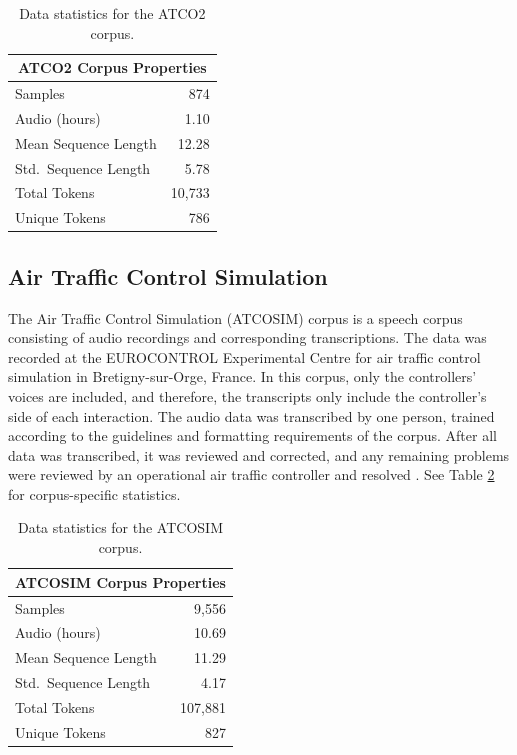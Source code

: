 \documentclass[12pt]{article}
\begin{document}
\begin{table}
    \centering
    \begin{tabular}{l r}
        \toprule
        \multicolumn{2}{c}{ATCO2 Corpus Properties} \\
        \midrule
        Samples              & 874                  \\
        Audio (hours)        & 1.10                 \\
        Mean Sequence Length & 12.28                \\
        Std.~Sequence Length & 5.78                 \\
        Total Tokens         & 10,733               \\
        Unique Tokens        & 786                  \\
        \bottomrule
    \end{tabular}
    \caption{Data statistics for the ATCO2 corpus.}
    \label{tab:atco2_stats}
\end{table}

\subsection{Air Traffic Control Simulation}\label{sec:atcosim}
The Air Traffic Control Simulation (ATCOSIM) corpus is a speech corpus consisting of audio recordings and corresponding transcriptions. The data was recorded at the EUROCONTROL Experimental Centre for air traffic control simulation in Bretigny-sur-Orge, France. In this corpus, only the controllers' voices are included, and therefore, the transcripts only include the controller's side of each interaction. The audio data was transcribed by one person, trained according to the guidelines and formatting requirements of the corpus. After all data was transcribed, it was reviewed and corrected, and any remaining problems were reviewed by an operational air traffic controller and resolved \cite{hofbauer_atcosim_2008}. See Table \ref{tab:atcosim_stats} for corpus-specific statistics.

\begin{table}
    \centering
    \begin{tabular}{l r}
        \toprule
        \multicolumn{2}{c}{ATCOSIM Corpus Properties} \\
        \midrule
        Samples              & 9,556                  \\
        Audio (hours)        & 10.69                  \\
        Mean Sequence Length & 11.29                  \\
        Std.~Sequence Length & 4.17                   \\
        Total Tokens         & 107,881                \\
        Unique Tokens        & 827                    \\
        \bottomrule
    \end{tabular}
    \caption{Data statistics for the ATCOSIM corpus.}
    \label{tab:atcosim_stats}
\end{table}
\end{document}
